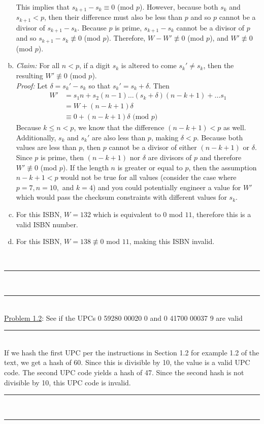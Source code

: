 \documentclass{article}
\newcommand{\problemsep}{\leavevmode\\[0.05in] \rule[\baselineskip/4]{\textwidth}{1pt} \\[0.005in] \rule[\baselineskip]{\textwidth}{1pt}\vspace{-\baselineskip}\leavevmode\\[0.05in]}
\newcommand{\statementsep}{\leavevmode\\[0.005in] \rule[\baselineskip/4]{\textwidth}{0.4pt}\leavevmode\\[0.005in]}
\begin{document}
\begin{enumerate}[(a)]
This implies that $s_{k+1} - s_k \equiv 0$ (mod $p$). However, because both $s_k$ and $s_{k+1} < p$, then their difference must also be less than $p$ and so $p$ cannot be a divisor of $s_{k+1} - s_k$. Because $p$ is prime, $s_{k+1} - s_k$ cannot be a divisor of $p$ and so $s_{k+1} - s_k \not\equiv 0$ (mod $p$). Therefore, $W - W' \not\equiv 0$ (mod $p$), and $W' \not\equiv 0$ (mod $p$).
\item {\it Claim: } For all $n < p$, if a digit $s_k$ is altered to come $s_k' \ne s_k$, then the resulting $W' \not\equiv 0$ (mod $p$). \\
			{\it Proof: } Let $\delta = s_k' - s_k$ so that $s_k' = s_k + \delta$. Then 
			\begin{equation*}\begin{aligned}
				W' &= s_1n + s_2(n-1) \hdots (s_k + \delta)(n - k + 1) + \hdots s_1 \\
				   &= W + (n - k + 1)\delta \\
					 &\equiv 0 + (n - k + 1)\delta \text{ (mod $p$)}
			\end{aligned}\end{equation*}
Because $k \le n < p$, we know that the difference $(n - k + 1) < p$ as well. Additionally, $s_k$ and $s_k'$ are also less than $p$, making $\delta < p$.  Because both values are less than $p$, then $p$ cannot be a divisor of either $(n - k + 1)$ or $\delta$. Since $p$ is prime, then $(n - k + 1)$ nor $\delta$ are divisors of $p$ and therefore $W' \not\equiv 0$ (mod $p$). If the length $n$ is greater or equal to $p$, then the assumption $n - k + 1 < p$ would not be true for all values (consider the case where $p = 7, n = 10,$ and $k = 4$) and you could potentially engineer a value for $W'$ which would pass the checksum constraints with different values for $s_k$.
\item For this ISBN, $W = 132$ which is equivalent to $0$ mod $11$, therefore this is a valid ISBN number.
\item For this ISBN, $W = 138 \not\equiv 0$ mod $11$, making this ISBN invalid.
\end{enumerate}
\problemsep
\noindent\underline{Problem 1.2}: 
See if the UPCs 0 59280 00020 0 and 0 41700 00037 9 are valid 
\statementsep
If we hash the first UPC per the instructions in Section 1.2 for example 1.2 of the text, we get a hash of 60.  Since this is divisible by 10, the value is a valid UPC code. The second UPC code yields a hash of 47.  Since the second hash is not divisible by 10, this UPC code is invalid.
\problemsep
\end{document}
